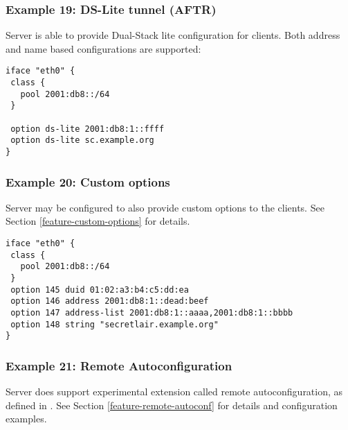\subsubsection{Example 19: DS-Lite tunnel (AFTR)}
Server is able to provide Dual-Stack lite configuration for clients.
Both address and name based configurations are supported:

\begin{lstlisting}
iface "eth0" {
 class {
   pool 2001:db8::/64
 }

 option ds-lite 2001:db8:1::ffff
 option ds-lite sc.example.org
}
\end{lstlisting}

\subsubsection{Example 20: Custom options}
\label{example-server-custom}
Server may be configured to also provide custom options to the
clients. See Section \ref{feature-custom-options} for details.

\begin{lstlisting}
iface "eth0" {
 class {
   pool 2001:db8::/64
 }
 option 145 duid 01:02:a3:b4:c5:dd:ea
 option 146 address 2001:db8:1::dead:beef
 option 147 address-list 2001:db8:1::aaaa,2001:db8:1::bbbb
 option 148 string "secretlair.example.org"
}
\end{lstlisting}


\subsubsection{Example 21: Remote Autoconfiguration}
Server does support experimental extension called remote
autoconfiguration, as defined in \cite{draft-remote-autoconf}. See
Section \ref{feature-remote-autoconf} for details and configuration
examples.

